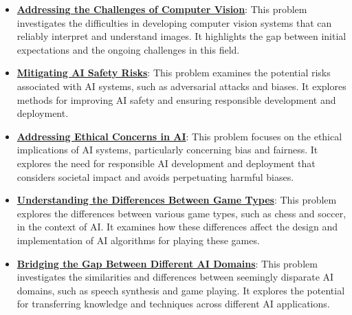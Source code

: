 \documentclass{article}%
\begin{document}
\begin{itemize}[leftmargin=*]
\item \href{https://purdue.brightspace.com/d2l/common/assets/pdfjs-d2l-dist/1.0.14-legacy/web/viewer.html?file=\%2Fcontent\%2Fenforced\%2F1095467-wl.202510.CS.24300.001\%2F02L2-Intro.pdf\%3Fou\%3D1095467\&lang=en-us\&container=d2l-fileviewer-rendered-pdf\&fullscreen=d2l-fileviewer-rendered-pdf-dialog\&height=667#page=15}{\textbf{Addressing the Challenges of Computer Vision}}: This problem investigates the difficulties in developing computer vision systems that can reliably interpret and understand images. It highlights the gap between initial expectations and the ongoing challenges in this field.%
\item \href{https://purdue.brightspace.com/d2l/common/assets/pdfjs-d2l-dist/1.0.14-legacy/web/viewer.html?file=\%2Fcontent\%2Fenforced\%2F1095467-wl.202510.CS.24300.001\%2F02L2-Intro.pdf\%3Fou\%3D1095467\&lang=en-us\&container=d2l-fileviewer-rendered-pdf\&fullscreen=d2l-fileviewer-rendered-pdf-dialog\&height=667#page=19}{\textbf{Mitigating AI Safety Risks}}: This problem examines the potential risks associated with AI systems, such as adversarial attacks and biases. It explores methods for improving AI safety and ensuring responsible development and deployment.%
\item \href{https://purdue.brightspace.com/d2l/common/assets/pdfjs-d2l-dist/1.0.14-legacy/web/viewer.html?file=\%2Fcontent\%2Fenforced\%2F1095467-wl.202510.CS.24300.001\%2F02L2-Intro.pdf\%3Fou\%3D1095467\&lang=en-us\&container=d2l-fileviewer-rendered-pdf\&fullscreen=d2l-fileviewer-rendered-pdf-dialog\&height=667#page=20}{\textbf{Addressing Ethical Concerns in AI}}: This problem focuses on the ethical implications of AI systems, particularly concerning bias and fairness. It explores the need for responsible AI development and deployment that considers societal impact and avoids perpetuating harmful biases.%
\item \href{https://purdue.brightspace.com/d2l/common/assets/pdfjs-d2l-dist/1.0.14-legacy/web/viewer.html?file=\%2Fcontent\%2Fenforced\%2F1095467-wl.202510.CS.24300.001\%2F02L2-Intro.pdf\%3Fou\%3D1095467\&lang=en-us\&container=d2l-fileviewer-rendered-pdf\&fullscreen=d2l-fileviewer-rendered-pdf-dialog\&height=667#page=27}{\textbf{Understanding the Differences Between Game Types}}: This problem explores the differences between various game types, such as chess and soccer, in the context of AI. It examines how these differences affect the design and implementation of AI algorithms for playing these games.%
\item \href{https://purdue.brightspace.com/d2l/common/assets/pdfjs-d2l-dist/1.0.14-legacy/web/viewer.html?file=\%2Fcontent\%2Fenforced\%2F1095467-wl.202510.CS.24300.001\%2F02L2-Intro.pdf\%3Fou\%3D1095467\&lang=en-us\&container=d2l-fileviewer-rendered-pdf\&fullscreen=d2l-fileviewer-rendered-pdf-dialog\&height=667#page=31}{\textbf{Bridging the Gap Between Different AI Domains}}: This problem investigates the similarities and differences between seemingly disparate AI domains, such as speech synthesis and game playing. It explores the potential for transferring knowledge and techniques across different AI applications.%

\end{itemize}
\end{document}

